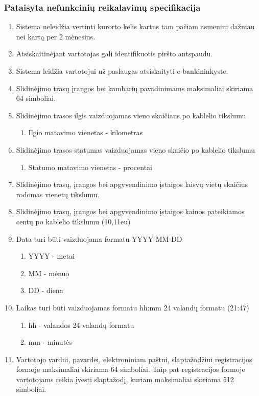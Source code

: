 \documentclass[oneside]{VUMIFPSkursinis}
\begin{document}
\subsubsection{Pataisyta nefunkcinių reikalavimų specifikacija}
\begin{enumerate}

	
	\item Sistema neleidžia vertinti kurorto kelis kartus tam pačiam asmeniui dažniau nei kartą per 2 mėnesius.

	\item Atsiskaitinėjant vartotojas gali identifikuotis piršto antspaudu.
	\item Sistema leidžia vartotojui už paslaugas atsiskaityti e-bankininkyste.
	\item Slidinėjimo trasų įrangos bei kambarių pavadinimams maksimaliai skiriama 64 simboliai.
	\item Slidinėjimo trasos ilgis vaizduojamas vieno skaičiaus po kablelio tikslumu
	\begin{enumerate}
		\item Ilgio matavimo vienetas - kilometras
	\end{enumerate}
	\item Slidinėjimo trasos statumas vaizduojamas vieno skaičio po kablelio tikslumu
	\begin{enumerate}
		\item Statumo matavimo vienetas - procentai
	\end{enumerate}
	\item Slidinėjimo trasų, įrangos bei apgyvendinimo įstaigos laisvų vietų skaičius rodomas vienetų tikslumu.
	\item Slidinėjimo trasų, įrangos bei apgyvendinimo įstaigos kainos pateikiamos centų po kablelio tikslumu (10,11eu)
	\item Data turi būti vaizduojama formatu YYYY-MM-DD
	\begin{enumerate}
		\item YYYY - metai
		\item MM - mėnuo
		\item DD - diena
	\end{enumerate}
	\item Laikas turi būti vaizduojamas formatu hh:mm 24 valandų formatu (21:47)
	\begin{enumerate}
		\item hh - valandos 24 valandų formatu
		\item mm - minutės
	\end{enumerate}
	\item Vartotojo vardui, pavardei, elektroniniam paštui, slaptažodžiui registracijos formoje maksimaliai skiriama 64 simboliai. Taip pat registracijos formoje vartotojams reikia įvesti slaptažodį, kuriam maksimaliai skiriama 512 simboliai.

\end{enumerate}
\end{document}
